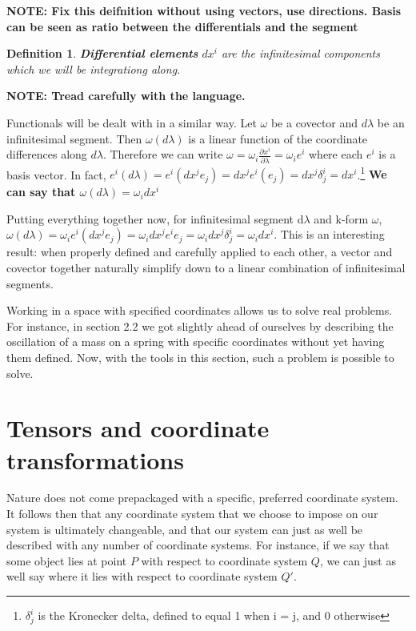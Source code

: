 \documentclass{book}
\newtheorem{defn}[equation]{Definition}
\begin{document}
\textbf{NOTE: Fix this deifnition without using vectors, use directions. Basis can be seen as ratio between the differentials and the segment}

\begin{defn}
	\textbf{Differential elements} $dx^i$ are the infinitesimal components which we will be integrationg along.  
\end{defn}

\textbf{NOTE: Tread carefully with the language. }

Functionals will be dealt with in a similar way. Let $\omega$ be a covector and $d\lambda$ be an infinitesimal segment. Then $\omega(d\lambda)$ is a linear function of the coordinate differences along $d\lambda$. Therefore we can write $\omega = \omega_i \frac{\partial x^i}{\partial \lambda} = \omega_i e^i$ where each $e^i$ is a basis vector. In fact, $e^i(d\lambda) = e^i(dx^j e_j) = dx^j e^i(e_j) = dx^j \delta^i_j = dx^i$.\footnote{$\delta^i_j$ is the Kronecker delta, defined to equal 1 when i = j, and 0 otherwise}
\textbf{We can say that $\omega(d\lambda) = \omega_i dx^i$}

Putting everything together now, for infinitesimal segment d$\lambda$ and k-form $\omega$, $\omega(d\lambda) = \omega_ie^i(dx^je_j) = \omega_idx^je^ie_j = \omega_idx^j\delta^i_j = \omega_i dx^i$. This is an interesting result: when properly defined and carefully applied to each other, a vector and covector together naturally simplify down to a linear combination of infinitesimal segments. 

Working in a space with specified coordinates allows us to solve real problems. For instance, in section 2.2 we got slightly ahead of ourselves by describing the oscillation of a mass on a spring with specific coordinates without yet having them defined. Now, with the tools in this section, such a problem is possible to solve.  



\section{Tensors and coordinate transformations}


Nature does not come prepackaged with a specific, preferred coordinate system. It follows then that any coordinate system that we choose to impose on our system is ultimately changeable, and that our system can just as well be described with any number of coordinate systems. For instance, if we say that some object lies at point $P$ with respect to coordinate system $Q$, we can just as well say where it lies with respect to coordinate system $Q'$. 
\end{document}
